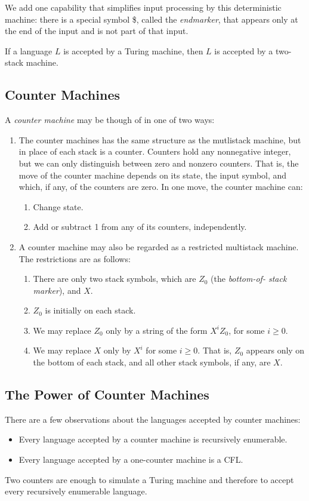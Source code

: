 \documentclass[]{article}
\begin{document}
We add one capability that simplifies input processing by this deterministic
machine: there is a special symbol \$, called the \emph{endmarker}, that appears
only at the end of the input and is not part of that input.

\begin{thm}
If a language $L$ is accepted by a Turing machine, then $L$ is accepted by a
two-stack machine.
\end{thm}

\subsection*{Counter Machines}
A \emph{counter machine} may be though of in one of two ways:
\begin{enumerate}
\item The counter machines has the same structure as the mutlistack machine, but
in place of each stack is a counter. Counters hold any nonnegative integer, but
we can only distinguish between zero and nonzero counters. That is, the move of
the counter machine depends on its state, the input symbol, and which, if any,
of the counters are zero. In one move, the counter machine can:
\begin{enumerate}
\item Change state.
\item Add or subtract 1 from any of its counters, independently.
\end{enumerate}
\item A counter machine may also be regarded as a restricted multistack machine.
The restrictions are as follows:
\begin{enumerate}
\item There are only two stack symbols, which are $Z_0$ (the \emph{bottom-of-
stack marker}), and $X$.
\item $Z_0$ is initially on each stack.
\item We may replace $Z_0$ only by a string of the form $X^iZ_0$, for some $i
\geq 0$.
\item We may replace $X$ only by $X^i$ for some $i \geq 0$. That is, $Z_0$
appears only on the bottom of each stack, and all other stack symbols, if any,
are $X$.
\end{enumerate}
\end{enumerate}

\subsection*{The Power of Counter Machines}
There are a few observations about the languages accepted by counter machines:
\begin{itemize}
\item Every language accepted by a counter machine is recursively enumerable.
\item Every language accepted by a one-counter machine is a CFL.
\end{itemize}
Two counters are enough to simulate a Turing machine and therefore to accept
every recursively enumerable language.
\end{document}
